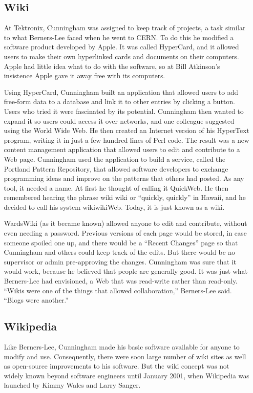 \documentclass[11pt]{article}
\begin{document}
\subsection{Wiki}
\par 
At Tektronix, Cunningham was assigned to keep track of projects, a task similar to what Berners-Lee faced when he went to CERN. To do this he modified a software product developed by  Apple. It was called HyperCard, and it allowed users to make their own hyperlinked cards and documents on their computers. Apple had little idea what to do with the software, so at Bill Atkinson’s insistence Apple gave it away free with its computers.\cite{innovators}\cite{c2-wiki}
\par
Using HyperCard, Cunningham built an application that allowed users to add free-form data to a database and link it to other entries by clicking a button. Users who tried it were fascinated by its potential. Cunningham then wanted to expand  it so users  could  access  it  over  networks, and one colleague suggested using the World Wide Web.\cite{cs-encyclopedia} He then created an Internet version of his HyperText program, writing it in just a few hundred lines of Perl code. The result was a new content management application that allowed users to edit and contribute to a Web page. Cunningham used the application to build a service, called the Portland Pattern Repository, that allowed software developers to exchange programming ideas and improve on the patterns that others had posted.\cite{innovators} As any tool, it needed a name. At first he thought of calling it QuickWeb. He  then  remembered  hearing  the  phrase wiki wiki or “quickly, quickly” in Hawaii, and he decided to call his system wikiwikiWeb. Today, it is just known as a wiki.\cite{cs-encyclopedia}\cite{c2-wiki}
\par 
WardsWiki (as it became known) allowed anyone to edit and contribute, without even needing a password. Previous versions of each page would be stored, in case someone spoiled one up, and there would be a “Recent Changes” page so that Cunningham and others could keep track of the edits. But there would be no supervisor or admin pre-approving the changes. Cunningham was sure that it would work, because he believed that people are generally good. It was just what Berners-Lee had envisioned, a Web that was read-write rather than read-only. “Wikis were one of the things that allowed collaboration,” Berners-Lee said. “Blogs were another.”\cite{innovators}
\subsection{Wikipedia}
\par
Like Berners-Lee, Cunningham made his basic software available for anyone to modify and use. Consequently, there were soon large number of wiki sites as well as open-source improvements to his software. But the wiki concept was not widely known beyond software engineers until January 2001, when Wikipedia was launched by Kimmy Wales and Larry Sanger.\cite{innovators}\cite{wiki-wikipedia}
\end{document}
